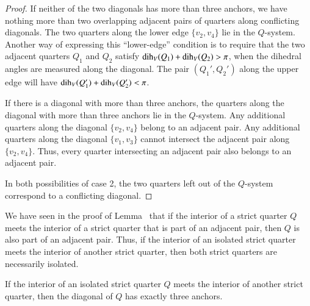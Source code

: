 \begin{tarskidata}
\begin{tarski}
\begin{proof}
If neither of the two diagonals has more than three anchors, we
have nothing more than two overlapping adjacent pairs of quarters
along conflicting diagonals.  The two quarters along the lower
edge $\{v_2,v_4\}$ lie in the $Q$-system.  Another way of
expressing this ``lower-edge'' condition is to require that the
two adjacent quarters $Q_1$ and $Q_2$ satisfy
$\operatorname{dih}_V(Q_1)+\operatorname{dih}_V(Q_2)>\pi$, when the dihedral angles are measured
along the diagonal. The pair $(Q_1',Q_2')$ along the upper edge
will have $\operatorname{dih}_V(Q_1')+\operatorname{dih}_V(Q_2')<\pi$.

If there is a diagonal with more than three anchors,  the quarters
along the diagonal with more than three anchors lie in the
$Q$-system.  Any additional quarters along the diagonal
$\{v_2,v_4\}$ belong to an adjacent pair. Any additional quarters
along the diagonal $\{v_1,v_3\}$ cannot intersect the adjacent
pair along $\{v_2,v_4\}$.  Thus, every quarter intersecting an
adjacent pair also belongs to an adjacent pair.

In both possibilities of case 2, the two quarters left out of the
$Q$-system correspond to a conflicting diagonal.
\end{proof}
\end{tarski}



\begin{remark}
We have seen in the proof of Lemma~ that if
the interior of a strict quarter $Q$ meets the interior of a
strict quarter that is part of an adjacent pair, then $Q$ is also
part of an adjacent pair. Thus, if the interior of an isolated
strict quarter meets the interior of another strict quarter, then
both strict quarters are necessarily isolated.
\end{remark}

\begin{tarski}

\begin{lemma}
If the interior of an isolated strict quarter $Q$ meets the
interior of another strict quarter, then the diagonal of $Q$ has
exactly three anchors.
\end{lemma}


\end{tarski}
\end{tarskidata}
